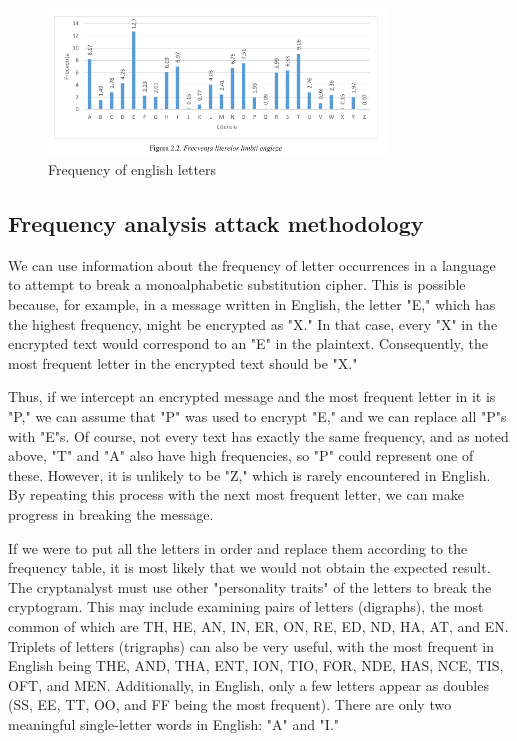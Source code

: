 \documentclass[12pt]{article}
\begin{document}
\begin{figure}[h!]
    \centering
    \includegraphics[width=0.8\textwidth]{img/Lom.png}
    \caption{Frequency of english letters}
    \label{fig:result1}
\end{figure}

\subsection*{Frequency analysis attack methodology}

We can use information about the frequency of letter occurrences in a language to attempt to break a monoalphabetic substitution cipher. This is possible because, for example, in a message written in English, the letter "E," which has the highest frequency, might be encrypted as "X." In that case, every "X" in the encrypted text would correspond to an "E" in the plaintext. Consequently, the most frequent letter in the encrypted text should be "X."

Thus, if we intercept an encrypted message and the most frequent letter in it is "P," we can assume that "P" was used to encrypt "E," and we can replace all "P"s with "E"s. Of course, not every text has exactly the same frequency, and as noted above, "T" and "A" also have high frequencies, so "P" could represent one of these. However, it is unlikely to be "Z," which is rarely encountered in English. By repeating this process with the next most frequent letter, we can make progress in breaking the message.

If we were to put all the letters in order and replace them according to the frequency table, it is most likely that we would not obtain the expected result. The cryptanalyst must use other "personality traits" of the letters to break the cryptogram. This may include examining pairs of letters (digraphs), the most common of which are TH, HE, AN, IN, ER, ON, RE, ED, ND, HA, AT, and EN. Triplets of letters (trigraphs) can also be very useful, with the most frequent in English being THE, AND, THA, ENT, ION, TIO, FOR, NDE, HAS, NCE, TIS, OFT, and MEN. Additionally, in English, only a few letters appear as doubles (SS, EE, TT, OO, and FF being the most frequent). There are only two meaningful single-letter words in English: "A" and "I."
\end{document}

